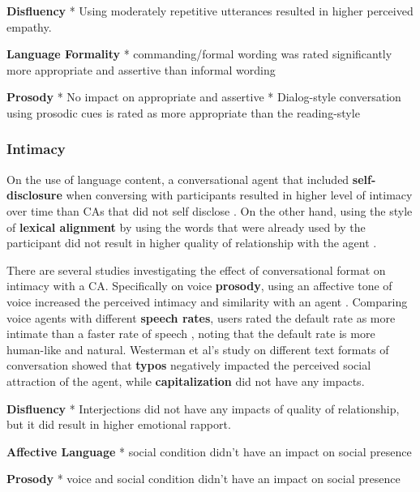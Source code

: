 \documentclass[sigconf,screen,review, anonymous]{acmart}
\newcommand{\cmt}[1]{}%
\begin{document}
\textbf{Disfluency}
* Using moderately repetitive utterances resulted in higher perceived empathy. \cite{yang2021effect}\cmt{[72]}

\textbf{Language Formality}
* commanding/formal wording was rated significantly more appropriate and assertive than informal wording \cite{jestin2022effects}\cmt{[81]}

\textbf{Prosody}
* No impact on appropriate and assertive \cite{jestin2022effects}\cmt{[81]}
* Dialog-style conversation using prosodic cues is rated as more appropriate than the reading-style \cite{misu2011toward}\cmt{[83]}

\subsubsection{Intimacy}
On the use of language content, a conversational agent that included \textbf{self-disclosure} when conversing with participants resulted in higher level of intimacy over time than CAs that did not self disclose \cite{lee2020hear}\cmt{[23]}. On the other hand, using the style of \textbf{lexical alignment} by using the words that were already used by the participant did not result in higher quality of relationship with the agent \cite{linnemann2018can}\cmt{[15]}.

There are several studies investigating the effect of conversational format on intimacy with a CA. Specifically on voice \textbf{prosody}, using an affective tone of voice increased the perceived intimacy and similarity with an agent \cite{kim2020can}\cmt{[24]}. Comparing voice agents with different \textbf{speech rates}, users rated the default rate as more intimate than a faster rate of speech \cite{choi2020nobody}\cmt{[54]}, noting that the default rate is more human-like and natural. Westerman et al's study on different text formats of conversation \cite{westerman2019believe}\cmt{[9]} showed that \textbf{typos} negatively impacted the perceived social attraction of the agent, while \textbf{capitalization} did not have any impacts.

\textbf{Disfluency}
* Interjections did not have any impacts of quality of relationship, but it did result in higher emotional rapport. \cite{ceha2022expressive}\cmt{[77]}

\textbf{Affective Language}
* social condition didn't have an impact on social presence \cite{lubold2016effects}\cmt{[86]}

\textbf{Prosody}
* voice and social condition didn't have an impact on social presence \cite{lubold2016effects}\cmt{[86]}
\end{document}

